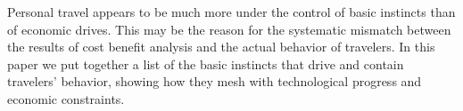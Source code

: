 Personal travel appears to be much more under the control of basic instincts than of economic drives. This may be the reason for the systematic mismatch between the results of cost benefit analysis and the actual behavior of travelers. In this paper we put together a list of the basic instincts that drive and contain travelers' behavior, showing how they mesh with technological progress and economic constraints.
